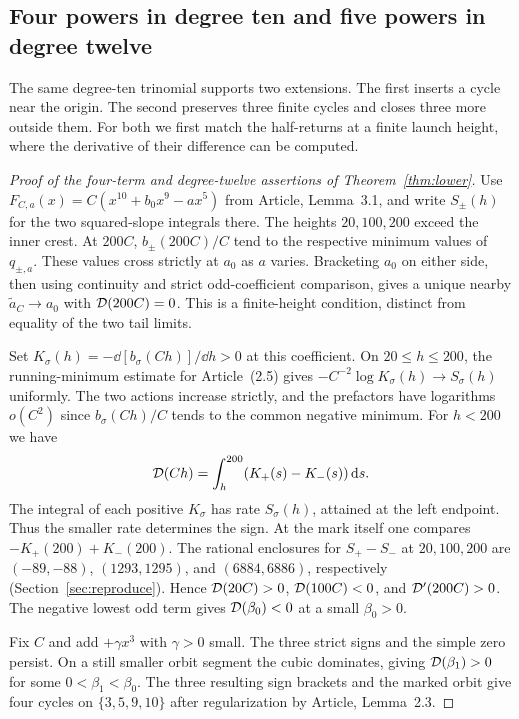 \subsection{Four powers in degree ten and five powers in degree twelve}\label{subsec:four-five}

The same degree-ten trinomial supports two extensions. The first inserts
a cycle near the origin. The second preserves three finite cycles and
closes three more outside them. For both we first match the half-returns at a
finite launch height, where the derivative of their difference can be computed.

\begin{proof}[Proof of the four-term and degree-twelve assertions of Theorem~\ref{thm:lower}]
Use $F_{C,a}(x)=C(x^{10}+b_0x^9-ax^5)$ from
Article, Lemma~3.1, and write $S_\pm(h)$ for the two
squared-slope integrals there. The heights $20,100,200$ exceed the
inner crest. At $200C$, $b_\pm(200C)/C$ tend to the respective
minimum values of $q_{\pm,a}$. These values cross strictly at $a_0$
as $a$ varies. Bracketing $a_0$ on either side, then using continuity
and strict odd-coefficient comparison, gives a unique nearby
$\tilde a_C\to a_0$ with $\mathcal{D}(200C)=0$. This is a finite-height
condition, distinct from equality of the two tail limits.

Set $K_\sigma(h)=-\dd[b_\sigma(Ch)]/\dd h>0$ at this coefficient.
On $20\le h\le200$, the running-minimum estimate for
Article~(2.5) gives $-C^{-2}\log K_\sigma(h)\to S_\sigma(h)$
uniformly. The two actions increase strictly, and the prefactors have
logarithms $o(C^2)$ since $b_\sigma(Ch)/C$ tends to the common
negative minimum. For $h<200$ we have
\[
 \mathcal{D}(Ch)=\int_h^{200}(K_+(s)-K_-(s))\,\mathrm{d} s.
\]
The integral of each positive $K_\sigma$ has rate $S_\sigma(h)$,
attained at the left endpoint. Thus the smaller rate determines the
sign. At the mark itself one compares $-K_+(200)+K_-(200)$.
The rational enclosures for $S_+-S_-$ at $20,100,200$ are
$(-89,-88)$, $(1293,1295)$, and $(6884,6886)$, respectively
(Section~\ref{sec:reproduce}). Hence $\mathcal{D}(20C)>0$, $\mathcal{D}(100C)<0$,
and $\mathcal{D}'(200C)>0$. The negative lowest odd term gives
$\mathcal{D}(\beta_0)<0$ at a small $\beta_0>0$.

Fix $C$ and add $+\gamma x^3$ with $\gamma>0$ small. The three
strict signs and the simple zero persist. On a still smaller orbit
segment the cubic dominates, giving $\mathcal{D}(\beta_1)>0$ for some
$0<\beta_1<\beta_0$. The three resulting sign brackets and the marked
orbit give four cycles on $\{3,5,9,10\}$ after regularization by
Article, Lemma~2.3.


\end{proof}
